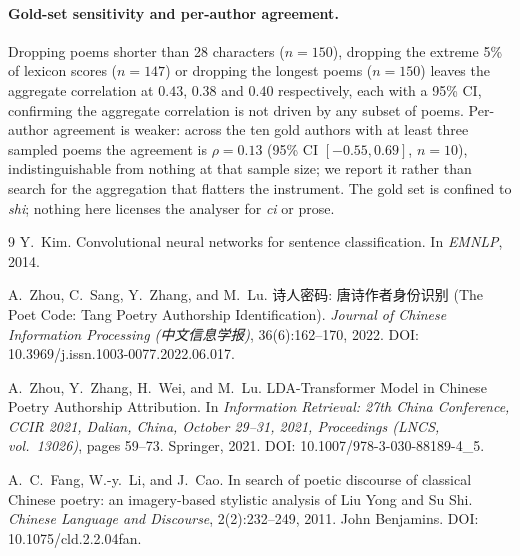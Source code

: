 \documentclass[11pt]{article}
\begin{document}
\paragraph{Gold-set sensitivity and per-author agreement.}
Dropping poems shorter than 28 characters ($n{=}150$), dropping the extreme 5\% of
lexicon scores ($n{=}147$) or dropping the longest poems ($n{=}150$) leaves the
aggregate correlation at $0.43$, $0.38$ and $0.40$ respectively, each with a 95\%
CI, confirming the aggregate correlation is not driven by any subset of poems. Per-author
agreement is weaker: across the ten gold authors with at least three sampled poems the
agreement is $\rho{=}0.13$ (95\% CI $[-0.55,0.69]$, $n{=}10$), indistinguishable from
nothing at that sample size; we report it rather than search for the aggregation that
flatters the instrument. The gold set is confined to \emph{shi}; nothing here licenses
the analyser for \emph{ci} or prose.


\begin{thebibliography}{9}
Y.~Kim.
\newblock Convolutional neural networks for sentence classification.
\newblock In \emph{EMNLP}, 2014.

A.~Zhou, C.~Sang, Y.~Zhang, and M.~Lu.
\newblock 诗人密码: 唐诗作者身份识别 (The Poet Code: Tang Poetry Authorship
Identification).
\newblock \emph{Journal of Chinese Information Processing
(中文信息学报)}, 36(6):162--170, 2022. DOI: 10.3969/j.issn.1003-0077.2022.06.017.

A.~Zhou, Y.~Zhang, H.~Wei, and M.~Lu.
\newblock LDA-Transformer Model in Chinese Poetry Authorship Attribution.
\newblock In \emph{Information Retrieval: 27th China Conference, CCIR 2021,
Dalian, China, October 29--31, 2021, Proceedings (LNCS, vol.~13026)}, pages
59--73. Springer, 2021. DOI: 10.1007/978-3-030-88189-4\_5.

A.~C.~Fang, W.-y.~Li, and J.~Cao.
\newblock In search of poetic discourse of classical Chinese poetry: an
  imagery-based stylistic analysis of Liu Yong and Su Shi.
\newblock \emph{Chinese Language and Discourse}, 2(2):232--249, 2011.
  John Benjamins. DOI: 10.1075/cld.2.2.04fan.
\end{thebibliography}
\end{document}
